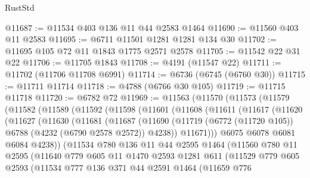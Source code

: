 \begin{lexlean}{RustStd}
\begin{coremodule}
@11687 := @11534 @403 @136 @11 @44 @2583 @1464
@11690 := @11560 @403 @11 @2583
@11695 := @6711 @11501 @1281 @1281 @134 @30
@11702 := @11695 @105 @72 @11 @1843 @1775 @2571 @2578
@11705 := @11542 @22 @31 @22
@11706 := @11705 @1843
@11708 := @4191 (@11547 @22)
@11711 := @11702 (@11706 @11708 @6991)
@11714 := @6736 (@6745 (@6760 @30))
@11715 := @11711 @11714
@11718 := @4788 (@6766 @30 @105)
@11719 := @11715 @11718
@11720 := @6782 @72
@11969 := @11563
    (@11570
      (@11573
        (@11579
          (@11582
            (@11589
              (@11592
                (@11598
                  (@11601
                    (@11608
                      (@11611
                        (@11617
                          (@11620
                            (@11627
                              (@11630
                                (@11681
                                  (@11687
                                    (@11690
                                      (@11719
                                        (@6772 (@11720 @105))
                                        @6788
                                        (@4232 (@6790 @2578 @2572))
                                        @4238))
                                    @11671)))
                              @6075
                              @6078
                              @6081
                              @6084
                              @4238))
                          (@11534
                            @780
                            @136
                            @11
                            @44
                            @2595
                            @1464
                            (@11560
                              @780
                              @11
                              @2595
                              (@11640
                                @779
                                @605
                                @11
                                @1470
                                @2593
                                @1281
                                @611
                                (@11529
                                  @779
                                  @605
                                  @2593
                                  (@11534
                                    @777
                                    @136
                                    @371
                                    @44
                                    @2591
                                    @1464
                                    (@11659
                                      @776

\end{coremodule}
\end{lexlean}
